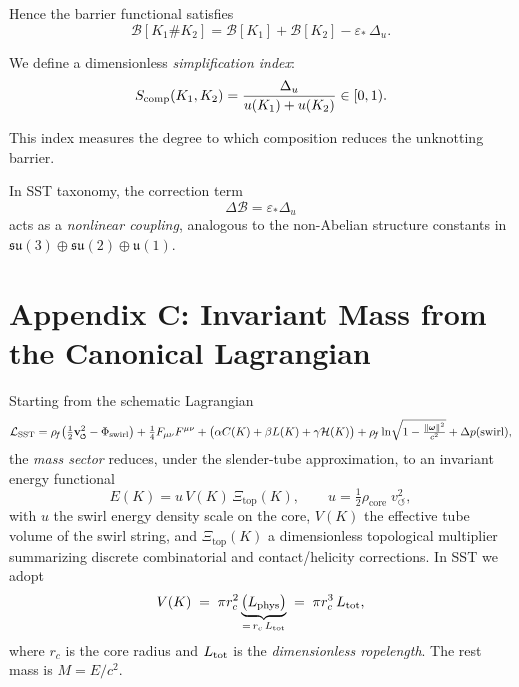 \documentclass[11pt]{article}
\begin{document}
Hence the barrier functional satisfies
\[
    \mathcal B[K_1 \# K_2]
    = \mathcal B[K_1] + \mathcal B[K_2] - \varepsilon_*\,\Delta_u.
\]

We define a dimensionless \emph{simplification index}:
\[
    S_{\rm comp}(K_1,K_2)
    = \frac{\Delta_u}{u(K_1)+u(K_2)} \in [0,1).
\]

This index measures the degree to which composition
reduces the unknotting barrier.

\medskip

In SST taxonomy, the correction term
\[
    \Delta\mathcal B = \varepsilon_* \Delta_u
\]
acts as a \emph{nonlinear coupling},
analogous to the non-Abelian structure constants
in $\mathfrak{su}(3)\oplus\mathfrak{su}(2)\oplus\mathfrak{u}(1)$.



\section*{Appendix C: Invariant Mass from the Canonical Lagrangian}

Starting from the schematic Lagrangian
\[
    \mathcal{L}_{\text{SST}}
    = \rhof\!\left(\tfrac{1}{2}\vswirl^2 - \Phi_{\text{swirl}}\right)
    + \tfrac{1}{4}F_{\mu\nu}F^{\mu\nu}
    + \big(\alpha C(K)+\beta L(K)+\gamma \mathcal{H}(K)\big)
    + \rhof \ln\!\sqrt{1-\tfrac{\|\boldsymbol\omega\|^2}{c^2}}
    + \Delta p(\text{swirl}),
\]
the \emph{mass sector} reduces, under the slender-tube approximation, to an invariant energy functional
\[
    E(K)= u\,V(K)\,\Xi_{\text{top}}(K),\qquad
    u=\tfrac{1}{2}\rho_{\text{core}}\;v_{\circlearrowleft}^{2},
\]
with $u$ the swirl energy density scale on the core, $V(K)$ the effective tube volume of the swirl string, and $\Xi_{\text{top}}(K)$ a dimensionless topological multiplier summarizing discrete combinatorial and contact/helicity corrections. In SST we adopt
\[
    V(K)\;=\;\pi r_c^2 \underbrace{\big(L_{\rm phys}\big)}_{=\,r_c\,L_{\rm tot}}
    \;=\;\pi r_c^3\,L_{\rm tot},
\]
where $r_c$ is the core radius and $L_{\rm tot}$ is the \emph{dimensionless ropelength}. The rest mass is $M=E/c^2$.
\end{document}
